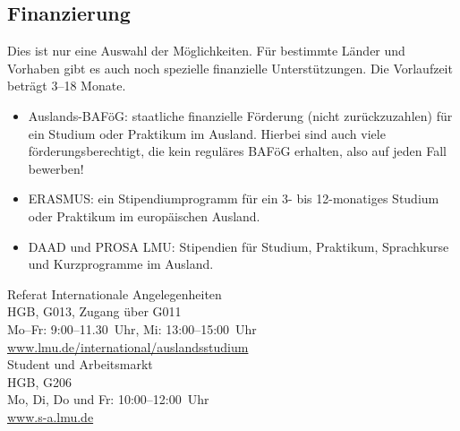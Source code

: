 \subsection{Finanzierung}

Dies ist nur eine Auswahl der Möglichkeiten. Für bestimmte Länder und
Vorhaben gibt es auch noch spezielle finanzielle Unterstützungen. Die
Vorlaufzeit beträgt 3--18 Monate.

\begin{itemize}
\item Auslands-BAFöG: staatliche finanzielle Förderung (nicht zurückzuzahlen) für ein Studium oder Praktikum im Ausland. Hierbei sind auch viele förderungsberechtigt, die kein reguläres BAFöG erhalten, also auf jeden Fall bewerben!
\item ERASMUS: ein Stipendiumprogramm für ein 3- bis 12-monatiges Studium oder Praktikum im europäischen Ausland.
\item DAAD und PROSA LMU: Stipendien für Studium, Praktikum, Sprachkurse und Kurzprogramme im Ausland.
\end{itemize}

Referat Internationale Angelegenheiten\\
HGB, G013, Zugang über G011\\
Mo--Fr: 9:00--11.30~Uhr, Mi: 13:00--15:00~Uhr\\
\url{www.lmu.de/international/auslandsstudium}\\


Student und Arbeitsmarkt\\
HGB, G206\\
Mo, Di, Do und Fr: 10:00--12:00~Uhr\\
\url{www.s-a.lmu.de}

